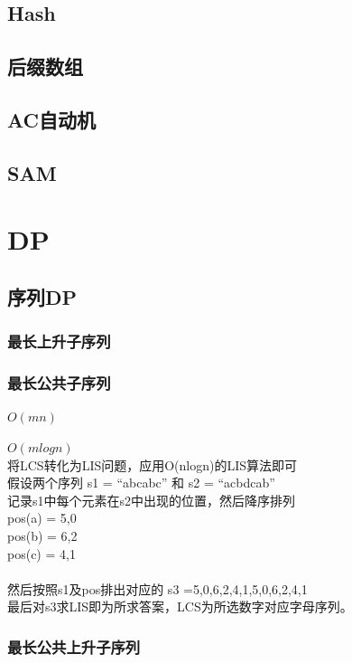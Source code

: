 \documentclass{article}
\begin{document}
\subsection{Hash}

\subsection{后缀数组}

\subsection{AC自动机}

\subsection{SAM}



\section{DP}
\subsection{序列DP}
\subsubsection{最长上升子序列}

\subsubsection{最长公共子序列}
$O(mn)$

$O(mlogn)$	\\
将LCS转化为LIS问题，应用O(nlogn)的LIS算法即可	\\
假设两个序列 s1 = “abcabc” 和 s2 = “acbdcab”\\
记录s1中每个元素在s2中出现的位置，然后降序排列	\\
pos(a) = {5,0}								\\
pos(b) = {6,2}								\\
pos(c) = {4,1}								\\
\\
然后按照s1及pos排出对应的 s3 ={5,0,6,2,4,1,5,0,6,2,4,1}	\\
最后对s3求LIS即为所求答案，LCS为所选数字对应字母序列。			\\

\subsubsection{最长公共上升子序列}

\end{document}

